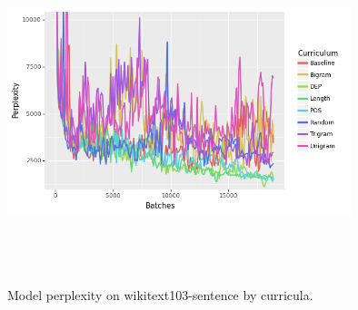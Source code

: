 \begin{figure}[h]
\centering
\label{fig:wikitext-103-sentence}
\includegraphics[width=10cm, height=10cm]{Thesis/images/wikitext-103sentenceraw.png}
\caption{Model perplexity on wikitext103-sentence by curricula.}
\end{figure}

